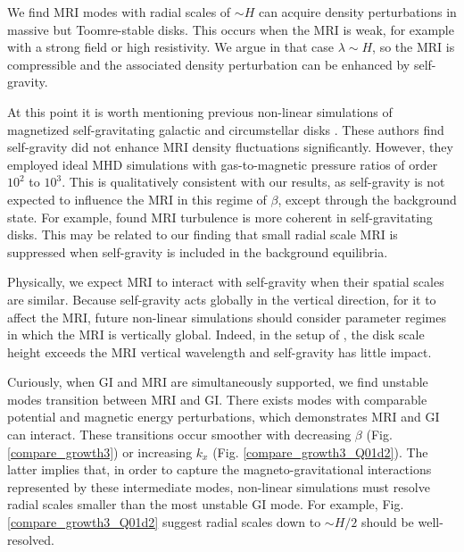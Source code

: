 We find MRI modes with radial scales of $\sim H$ can acquire  
density perturbations in massive but Toomre-stable disks. 
This occurs when the MRI is weak, for example with a strong field or
high resistivity. We argue in that case $\lambda\sim H$, so the MRI is
compressible and the associated density
perturbation can be enhanced by self-gravity.


At this point it is worth mentioning previous non-linear simulations 
of magnetized self-gravitating galactic and circumstellar disks
\citep{kim03,fromang04a,fromang04}. These authors find self-gravity
did not enhance MRI density fluctuations significantly. However, they
employed ideal MHD simulations with gas-to-magnetic pressure ratios of
order $10^2$ to $10^3$. %
This is qualitatively consistent with our results, as 
self-gravity is not expected to influence the MRI in this  
regime of $\beta$, except through the background state. 
For example, \cite{fromang04} found
MRI turbulence is more coherent in self-gravitating disks. This may be related
to our finding that small radial scale MRI is suppressed when
self-gravity is included in the background equilibria. 

Physically, we expect MRI to interact with self-gravity when
their spatial scales are similar. Because self-gravity acts globally in the
vertical direction, for it to affect the MRI, future non-linear
simulations should consider parameter regimes in which the MRI is
vertically global. %
Indeed, in the setup of \cite{kim03}, the disk
scale height exceeds the MRI vertical wavelength and self-gravity has
little impact.   



Curiously, when GI and MRI are simultaneously supported, we find
unstable modes transition between MRI and GI. There exists modes 
with comparable potential and magnetic energy perturbations, which 
demonstrates MRI and GI can interact. These 
transitions occur smoother with decreasing $\beta$
(Fig. \ref{compare_growth3}) or increasing $k_x$
(Fig. \ref{compare_growth3_Q01d2}). The latter implies that, in order
to capture the magneto-gravitational interactions represented by these
intermediate modes, non-linear simulations must resolve radial scales
smaller than the most unstable GI mode. For example, 
Fig. \ref{compare_growth3_Q01d2} suggest radial scales down to $\sim H/2$
should be well-resolved. 

